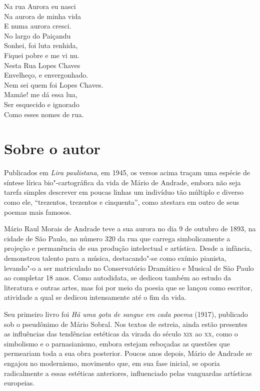 

\epigraph{Na rua Aurora eu nasci\\
Na aurora de minha vida\\
E numa aurora cresci.\\[5pt]
No largo do Paiçandu\\
Sonhei, foi luta renhida,\\
Fiquei pobre e me vi nu.\\[5pt]
Nesta Rua Lopes Chaves\\
Envelheço, e envergonhado.\\
Nem sei quem foi Lopes Chaves.\\[5pt]
Mamãe! me dá essa lua,\\
Ser esquecido e ignorado\\
Como esses nomes de rua.}{}

\section{Sobre o autor}

\noindent{}Publicados em
\emph{Lira paulistana}, em 1945, os versos acima traçam uma espécie de
síntese lírica bio"-cartográfica da vida de Mário de Andrade, embora não
seja tarefa simples descrever em poucas linhas um indivíduo tão múltiplo
e diverso como ele, ``trezentos, trezentos e cinquenta'', como atestara
em outro de seus poemas mais famosos.

Mário Raul Morais de Andrade teve a sua aurora no dia 9 de outubro de
1893, na cidade de São Paulo, no número 320 da rua que carrega
simbolicamente a projeção e permanência de sua produção intelectual e
artística. Desde a infância, demonstrou talento para a música,
destacando"-se como exímio pianista, levando"-o a ser matriculado no
Conservatório Dramático e Musical de São Paulo ao completar 18 anos.
Como autodidata, se dedicou também ao estudo da literatura e outras
artes, mas foi por meio da poesia que se lançou como escritor, atividade
a qual se dedicou intensamente até o fim da vida.

Seu primeiro livro foi \emph{Há uma gota de sangue em cada poema}
(1917), publicado sob o pseudônimo de Mário Sobral. Nos textos de
estreia, ainda estão presentes as influências das tendências estéticas
da virada do século \textsc{xix} ao \textsc{xx}, como o simbolismo e o parnasianismo,
embora estejam esboçadas as questões que permeariam toda a sua obra
posterior. Poucos anos depois, Mário de Andrade se engajou no
modernismo, movimento que, em sua fase inicial, se oporia radicalmente a
essas estéticas anteriores, influenciado pelas vanguardas artísticas
europeias.

